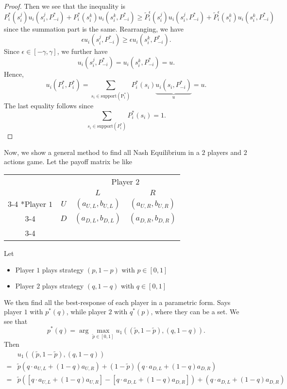 \begin{proof}
	Then we see that the inequality is
	\[
		P_{i}^{*}(s_{i}^j)u_{i}(s_{i}^j, P_{-i}^{*})+ P_{i}^{*}(s_{i}^k)u_{i}(s_{i}^k, P_{-i}^{*})\geq \widetilde{P}_{i}^{\epsilon}(s_{i}^j)u_{i}(s_{i}^j, P^{*}_{-i})+\widetilde{P}_{i}^{\epsilon}(s_{i}^k)u_{i}(s_{i}^k, P^{*}_{-i})
	\]
	since the summation part is the same. Rearranging, we have
	\[
		\epsilon u_{i}(s_{i}^j, P^{*}_{-i})\geq \epsilon u_{i}(s_{i}^k, P^{*}_{-i}).
	\]
	Since \(\epsilon\in\left[-\gamma, \gamma\right]\), we further have
	\[
		u_{i}(s_{i}^j, P^{*}_{-i}) = u_{i}(s_{i}^k, P^{*}_{-i}) = u.
	\]
	Hence,
	\[
		u_{i}(P^{*}_{i}, P^{*}_{i}) = \sum\limits_{s_{i}\in \mathrm{\text{support}(P^{*}_{i})} }P^{*}_{i}(s_{i})\underbrace{u_{i}(s_{i}, P^{*}_{-i})}_{u} = u.
	\]
	The last equality follows since
	\[
		\sum\limits_{s_{i}\in \mathrm{support}(P^{*}_i) } P_{i}^{*}(s_{i}) = 1.
	\]
\end{proof}

Now, we show a general method to find all Nash Equilibrium in a \(2\) players and \(2\) actions game. Let the payoff matrix be like
\begin{table}[H]
	\centering
	\setlength{\extrarowheight}{2pt}
	\begin{tabular}{cc|c|c|}
		                          & \multicolumn{1}{c}{} & \multicolumn{2}{c}{Player $2$}                           \\
		                          & \multicolumn{1}{c}{} & \multicolumn{1}{c}{$L$}        & \multicolumn{1}{c}{$R$} \\\cline{3-4}
		\multirow{2}*{Player $1$} & $U$                  & $(a_{U, L}, b_{U, L})$         & $(a_{U, R}, b_{U, R})$  \\\cline{3-4}
		                          & $D$                  & $(a_{D, L}, b_{D, L})$         & $(a_{D, R}, b_{D, R})$  \\\cline{3-4}
	\end{tabular}
\end{table}
Let
\begin{itemize}
	\item Player \(1\) plays strategy \((p, 1 - p)\) with \(p\in \left[0, 1\right]\)
	\item Player \(2\) plays strategy \((q, 1 - q)\) with \(q\in \left[0, 1\right]\)
\end{itemize}

We then find all the best-response of each player in a parametric form.
Says player \(1\) with \(p^{*}(q)\), while player \(2\) with \(q^{*}(p)\), where they can be a set. We see that
\[
	p^{*}(q) = \arg\max_{\widetilde{p}\in\left[0, 1\right]}u_1\left((\widetilde{p}, 1 - \widetilde{p}), (q, 1 - q)\right).
\]
Then
\[
	\begin{split}
		&u_1\left((\widetilde{p}, 1 - \widetilde{p}), (q, 1 - q)\right) \\
		= &\widetilde{p}\left(q\cdot a_{U, L} + (1 - q)a_{U, R}\right)+(1 - \widetilde{p})\left(q\cdot a_{D, L}+(1 - q)a_{D, R}\right)\\
		= &\widetilde{p}\left(\left[q\cdot a_{U, L}+(1 - q)a_{U, R}\right] - \left[q\cdot a_{D, L} + (1 - q)a_{D, R}\right]\right)+\left(q\cdot a_{D, L}+(1 - q)a_{D, R}\right)
	\end{split}
\]

